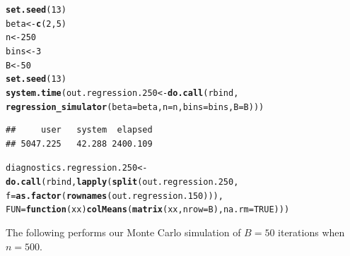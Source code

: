 \documentclass[11pt]{article}\usepackage[]{graphicx}\usepackage[]{color}
\makeatletter
\newcommand{\hlnum}[1]{\textcolor[rgb]{0.686,0.059,0.569}{#1}}%
\newcommand{\hlstd}[1]{\textcolor[rgb]{0.345,0.345,0.345}{#1}}%
\newcommand{\hlkwa}[1]{\textcolor[rgb]{0.161,0.373,0.58}{\textbf{#1}}}%
\newcommand{\hlkwb}[1]{\textcolor[rgb]{0.69,0.353,0.396}{#1}}%
\newcommand{\hlkwc}[1]{\textcolor[rgb]{0.333,0.667,0.333}{#1}}%
\newcommand{\hlkwd}[1]{\textcolor[rgb]{0.737,0.353,0.396}{\textbf{#1}}}%
\newenvironment{kframe}{%
 \def\at@end@of@kframe{}%
 \ifinner\ifhmode%
  \def\at@end@of@kframe{\end{minipage}}%
  \begin{minipage}{\columnwidth}%
 \fi\fi%
 \def\FrameCommand##1{\hskip\@totalleftmargin \hskip-\fboxsep
 \colorbox{shadecolor}{##1}\hskip-\fboxsep
     \hskip-\linewidth \hskip-\@totalleftmargin \hskip\columnwidth}%
 \MakeFramed {\advance\hsize-\width
   \@totalleftmargin\z@ \linewidth\hsize
   \@setminipage}}%
 {\par\unskip\endMakeFramed%
 \at@end@of@kframe}
\newenvironment{knitrout}{}{} %
\makeatother
\begin{document}
\begin{knitrout}
\color{fgcolor}\begin{kframe}
\begin{alltt}
\hlkwd{set.seed}\hlstd{(}\hlnum{13}\hlstd{)}
\hlstd{beta} \hlkwb{<-} \hlkwd{c}\hlstd{(}\hlnum{2}\hlstd{,} \hlnum{5}\hlstd{)}
\hlstd{n} \hlkwb{<-} \hlnum{250}
\hlstd{bins} \hlkwb{<-} \hlnum{3}
\hlstd{B} \hlkwb{<-} \hlnum{50}
\hlkwd{set.seed}\hlstd{(}\hlnum{13}\hlstd{)}
\hlkwd{system.time}\hlstd{(out.regression.250} \hlkwb{<-} \hlkwd{do.call}\hlstd{(rbind,}
  \hlkwd{regression_simulator}\hlstd{(}\hlkwc{beta} \hlstd{= beta,} \hlkwc{n} \hlstd{= n,} \hlkwc{bins} \hlstd{= bins,} \hlkwc{B} \hlstd{= B)))}
\end{alltt}
\begin{verbatim}
##     user   system  elapsed 
## 5047.225   42.288 2400.109
\end{verbatim}
\begin{alltt}
\hlstd{diagnostics.regression.250} \hlkwb{<-} \hlkwd{do.call}\hlstd{(rbind,} \hlkwd{lapply}\hlstd{(}\hlkwd{split}\hlstd{(out.regression.250,}
  \hlkwc{f} \hlstd{=} \hlkwd{as.factor}\hlstd{(}\hlkwd{rownames}\hlstd{(out.regression.150))),}
  \hlkwc{FUN} \hlstd{=} \hlkwa{function}\hlstd{(}\hlkwc{xx}\hlstd{)} \hlkwd{colMeans}\hlstd{(}\hlkwd{matrix}\hlstd{(xx,} \hlkwc{nrow} \hlstd{= B),} \hlkwc{na.rm} \hlstd{=} \hlnum{TRUE}\hlstd{)))}
\end{alltt}
\end{kframe}
\end{knitrout}


The following performs our Monte Carlo simulation of $B = 50$ iterations 
when $n = 500$.
\end{document}
